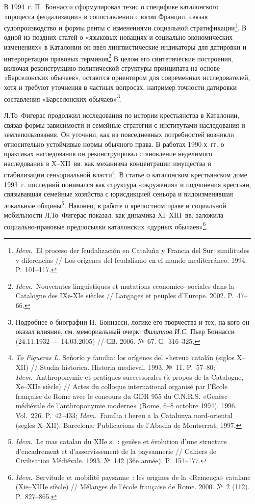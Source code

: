 В 1994~г. П.~Боннасси сформулировал тезис о специфике каталонского «процесса феодализации» в сопоставлении с югом Франции, связав судопроизводство и формы ренты с изменениями социальной стратификации\footnote{\emph{Idem.}~El proceso der feudalización en Cataluña y Francia del Sur: similitudes y diferencias // Los orígenes del feudalismo en el mundo mediterráneo. 1994. P.~101--117.}. В одной из поздних статей о «языковых новациях и социально-экономических изменениях» в Каталонии он ввёл лингвистические индикаторы для датировки и интерпретации правовых терминов\footnote{\emph{Idem.}~Nouveautes linguistiques et mutations economico- sociales dans la Catalogne des IXe-XIe siècles // Langages et peuples d’Europe. 2002. P.~47--66.} В целом его синтетические построения, включая реконструкцию политической структуры принципата на основе «Барселонских обычаев», остаются ориентиром для современных исследователей, хотя и требуют уточнения в частных вопросах, например точности датировки составления «Барселонских обычаев»\footnote{Подробнее о биографии П.~Боннасси, логике его творчества и тех, на кого он оказал влияние, см. мемориальный очерк: \emph{Филиппов И.С}. Пьер Боннасси (24.11.1932 --- 14.03.2005) // СВ. 2006. №~67. С.~316--325.}.

Л.То~Фигерас продолжил исследования по истории крестьянства в Каталонии, связав формы зависимости и семейные стратегии с институтами наследования и землепользования. Он уточнил, как из повседневных потребностей возникли относительно устойчивые нормы обычного права. В работах 1990-х~гг. о практиках наследования он реконструировал становление неделимого наследования в X--XII~вв. как механизма концентрации имущества и стабилизации сеньориальной власти\footnote{\emph{To Figueras L.} Señorío y familia: los orígenes del «hereu» catalán (siglos X--XII) // Studia historica. Historia medieval. 1993. №~11. P.~57--80; \emph{Idem.}~Anthroponymie et pratiques successorales (à propos de la Catalogne, Xe--XIIe siècle) // Actes du colloque international organisé par l’École française de Rome avec le concours du GDR 955 du C.N.R.S. «Genèse médiévale de l’anthroponymie moderne» (Rome, 6--8 octobre 1994). 1996. Vol.~226. P.~42--433; \emph{Idem.}~Família i hereu a la Catalunya nord-oriental (segles X--XII). Barcelona: Publicacions de l’Abadia de Montserrat, 1997.}. В статье о каталонском крестьянском доме 1993~г. последний понимался как структура «окружения» и подчинения крестьян, связывавшая семейные хозяйства с юрисдикцией сеньора и видоизменявшая локальные общины\footnote{\emph{Idem.}~Le mas catalan du XIIe s.~: genèse et évolution d’une structure d’encadrement et d’asservissement de la paysannerie // Cahiers de Civilisation Médiévale. 1993. №~142 (36e année). P.~151--177.}. Наконец, в работе о крепостном праве и социальной мобильности Л.То~Фигерас показал, как динамика XI--XIII~вв. заложила социально-правовые предпосылки каталонских «дурных обычаев»\footnote{\emph{Idem.}~Servitude et mobilité paysanne~: les origines de la «Remença» catalane (Xie--XIIIe siècle) // Mélanges de l’école française de Rome. 2000. №~2 (112). P.~827--865.}.

